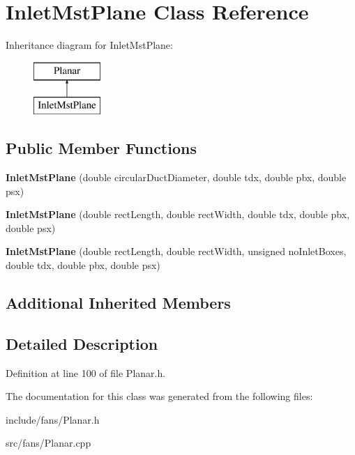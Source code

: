 \hypertarget{class_inlet_mst_plane}{}\section{Inlet\+Mst\+Plane Class Reference}
\label{class_inlet_mst_plane}
Inheritance diagram for Inlet\+Mst\+Plane\+:\begin{figure}[H]
\begin{center}
\leavevmode
\includegraphics[height=2.000000cm]{d6/d96/class_inlet_mst_plane}
\end{center}
\end{figure}
\subsection*{Public Member Functions}
\begin{DoxyCompactItemize}
\item 
\mbox{\label{class_inlet_mst_plane_a28e49257446ce8eaffe85e5208a37679}} 
{\bfseries Inlet\+Mst\+Plane} (double circular\+Duct\+Diameter, double tdx, double pbx, double psx)
\item 
\mbox{\label{class_inlet_mst_plane_a7ef5ba8a7f1cbb55236ca97418d78a56}} 
{\bfseries Inlet\+Mst\+Plane} (double rect\+Length, double rect\+Width, double tdx, double pbx, double psx)
\item 
\mbox{\label{class_inlet_mst_plane_ab29a93aa3ac15b676590499bc91d387e}} 
{\bfseries Inlet\+Mst\+Plane} (double rect\+Length, double rect\+Width, unsigned no\+Inlet\+Boxes, double tdx, double pbx, double psx)
\end{DoxyCompactItemize}
\subsection*{Additional Inherited Members}


\subsection{Detailed Description}


Definition at line 100 of file Planar.\+h.



The documentation for this class was generated from the following files\+:\begin{DoxyCompactItemize}
\item 
include/fans/Planar.\+h\item 
src/fans/Planar.\+cpp\end{DoxyCompactItemize}
